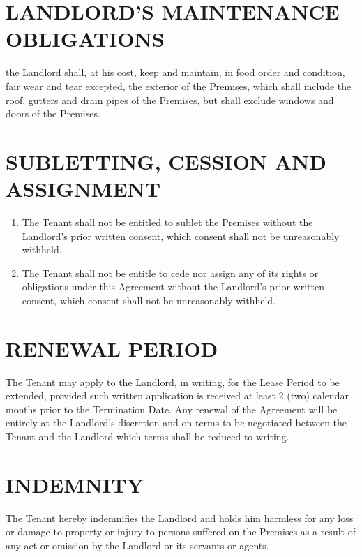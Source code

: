 \documentclass[11pt]{article}
\begin{document}
\section{\uppercase{landlord's maintenance obligations}}
\label{sec:landlord-maintenance-obligations}

the Landlord shall, at his cost, keep and maintain, in food order and condition, fair wear and tear excepted, the exterior of the Premises, which shall include the roof, gutters and drain pipes of the Premises, but shall exclude windows and doors of the Premises.

\section{\uppercase{subletting, cession and assignment}}
\label{sec:subletting-cession-assignment}

\begin{enumerate}
	\item The Tenant shall not be entitled to sublet the Premises without the Landlord's prior written consent, which consent shall not be unreasonably withheld.
	\item The Tenant shall not be entitle to cede nor assign any of its rights or obligations under this Agreement without the Landlord's prior written consent, which consent shall not be unreasonably withheld.
\end{enumerate}

\section{\uppercase{renewal period}}
\label{sec:renewal-period}

The Tenant may apply to the Landlord, in writing, for the Lease Period to be extended, provided such written application is received at least 2 (two) calendar months prior to the Termination Date. Any renewal of the Agreement will be entirely at the Landlord's discretion and on terms to be negotiated between the Tenant and the Landlord which terms shall be reduced to writing.

\section{\uppercase{indemnity}}
\label{sec:indemnity}

The Tenant hereby indemnifies the Landlord and holds him harmless for any loss or damage to property or injury to persons suffered on the Premises as a result of any act or omission by the Landlord or its servants or agents.
\end{document}
